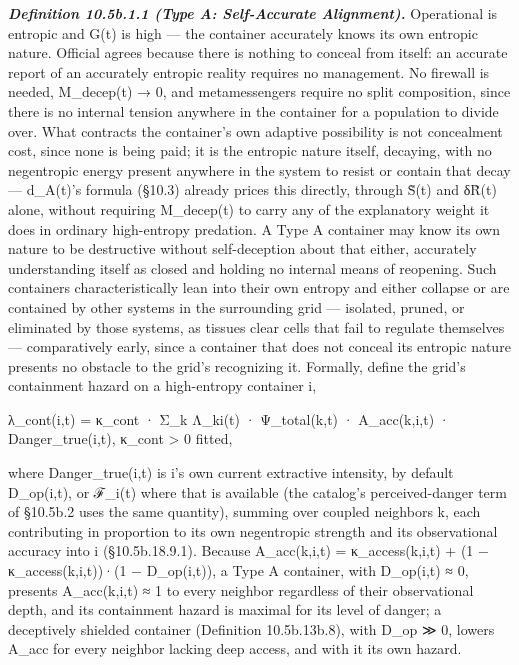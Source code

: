 \documentclass[
]{article}
\begin{document}
\emph{\textbf{Definition 10.5b.1.1 (Type A: Self-Accurate Alignment).}}
Operational is entropic and G(t) is high --- the container accurately
knows its own entropic nature. Official agrees because there is nothing
to conceal from itself: an accurate report of an accurately entropic
reality requires no management. No firewall is needed, M\_decep(t) → 0,
and metamessengers require no split composition, since there is no
internal tension anywhere in the container for a population to divide
over. What contracts the container's own adaptive possibility is not
concealment cost, since none is being paid; it is the entropic nature
itself, decaying, with no negentropic energy present anywhere in the
system to resist or contain that decay --- d\_A(t)'s formula (§10.3)
already prices this directly, through S̃(t) and δR̃(t) alone, without
requiring M\_decep(t) to carry any of the explanatory weight it does in
ordinary high-entropy predation. A Type A container may know its own
nature to be destructive without self-deception about that either,
accurately understanding itself as closed and holding no internal means
of reopening. Such containers characteristically lean into their own
entropy and either collapse or are contained by other systems in the
surrounding grid --- isolated, pruned, or eliminated by those systems,
as tissues clear cells that fail to regulate themselves ---
comparatively early, since a container that does not conceal its
entropic nature presents no obstacle to the grid's recognizing it.
Formally, define the grid's containment hazard on a high-entropy
container i,

λ\_cont(i,t) = κ\_cont · Σ\_k Λ\_ki(t) · Ψ\_total(k,t) · A\_acc(k,i,t) ·
Danger\_true(i,t), κ\_cont \textgreater{} 0 fitted,

where Danger\_true(i,t) is i's own current extractive intensity, by
default D\_op(i,t), or ℱ\_i(t) where that is available (the catalog's
perceived-danger term of §10.5b.2 uses the same quantity), summing over
coupled neighbors k, each contributing in proportion to its own
negentropic strength and its observational accuracy into i
(§10.5b.18.9.1). Because A\_acc(k,i,t) = κ\_access(k,i,t) + (1 −
κ\_access(k,i,t))·(1 − D\_op(i,t)), a Type A container, with D\_op(i,t)
≈ 0, presents A\_acc(k,i,t) ≈ 1 to every neighbor regardless of their
observational depth, and its containment hazard is maximal for its level
of danger; a deceptively shielded container (Definition 10.5b.13b.8),
with D\_op ≫ 0, lowers A\_acc for every neighbor lacking deep access,
and with it its own hazard.
\end{document}
